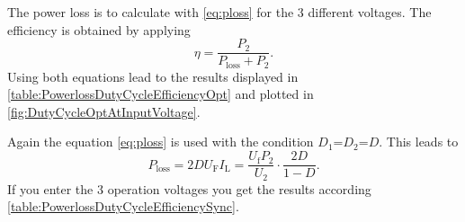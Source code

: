 \begin{solutionblock}
    The power loss is to calculate with \eqref{eq:ploss} for the 3 different voltages.
    The efficiency is obtained by applying
    \begin{equation}
        \eta = \frac{P_\mathrm{2}}{P_\mathrm{loss}+P_\mathrm{2}}.
    \end{equation}
    Using both equations lead to the results displayed in \autoref{table:PowerlossDutyCycleEfficiencyOpt} 
    and plotted in \autoref{fig:DutyCycleOptAtInputVoltage}.

    
    
    
\end{solutionblock}


\begin{solutionblock}
    Again the equation \eqref{eq:ploss} is used with the condition $D_1$=$D_2$=$D$. This leads to
    \begin{equation}
        P_\mathrm{loss}=2D U_\mathrm{F} I_\mathrm{L} = \frac{U_\mathrm{f} P_\mathrm{2}}{U_\mathrm{2}} \cdot \frac{2D}{1-D}.
    \end{equation}
    If you enter the 3 operation voltages you get the results according \autoref{table:PowerlossDutyCycleEfficiencySync}.
    
    
\end{solutionblock}


